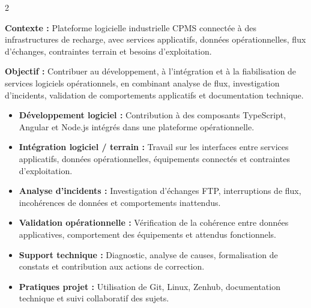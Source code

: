\documentclass[8pt,a4paper,ragged2e,withhyper]{altacv}
\begin{document}



\makecvheader
\vspace{-0.3cm}


\begin{paracol}{2}



\textbf{Contexte :} Plateforme logicielle industrielle CPMS connectée à des infrastructures de recharge, avec services applicatifs, données opérationnelles, flux d’échanges, contraintes terrain et besoins d’exploitation.

\textbf{Objectif :} Contribuer au développement, à l’intégration et à la fiabilisation de services logiciels opérationnels, en combinant analyse de flux, investigation d’incidents, validation de comportements applicatifs et documentation technique.

\begin{itemize}
  \item \textbf{Développement logiciel :} Contribution à des composants TypeScript, Angular et Node.js intégrés dans une plateforme opérationnelle.
  \item \textbf{Intégration logiciel / terrain :} Travail sur les interfaces entre services applicatifs, données opérationnelles, équipements connectés et contraintes d’exploitation.
  \item \textbf{Analyse d’incidents :} Investigation d’échanges FTP, interruptions de flux, incohérences de données et comportements inattendus.
  \item \textbf{Validation opérationnelle :} Vérification de la cohérence entre données applicatives, comportement des équipements et attendus fonctionnels.
  \item \textbf{Support technique :} Diagnostic, analyse de causes, formalisation de constats et contribution aux actions de correction.
  \item \textbf{Pratiques projet :} Utilisation de Git, Linux, Zenhub, documentation technique et suivi collaboratif des sujets.
\end{itemize}


\end{paracol}
\end{document}
